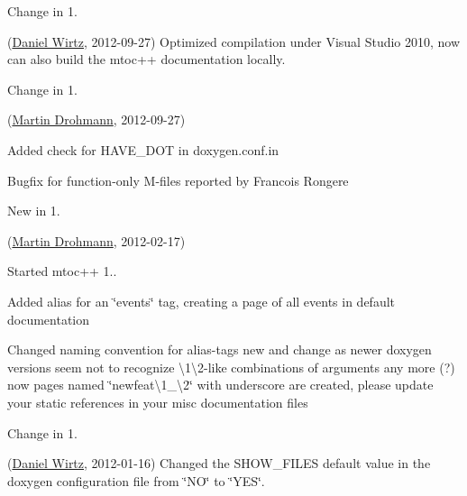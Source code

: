 \begin{DoxyRefDesc}{Change in 1.}
\item[\hyperlink{changelog1_4__changelog1_4000007}{Change in 1.\+4}](\hyperlink{developers_dw}{Daniel Wirtz}, 2012-\/09-\/27) Optimized compilation under Visual Studio 2010, now can also build the mtoc++ documentation locally.\end{DoxyRefDesc}


\begin{DoxyRefDesc}{Change in 1.}
\item[\hyperlink{changelog1_4__changelog1_4000008}{Change in 1.\+4}](\hyperlink{developers_md}{Martin Drohmann}, 2012-\/09-\/27)
\begin{DoxyItemize}
\item Added check for H\+A\+V\+E\+\_\+\+D\+O\+T in doxygen.\+conf.\+in
\item Bugfix for function-\/only M-\/files reported by Francois Rongere
\end{DoxyItemize}\end{DoxyRefDesc}


\begin{DoxyRefDesc}{New in 1.}
\item[\hyperlink{newfeat1_4__newfeat1_4000002}{New in 1.\+4}](\hyperlink{developers_md}{Martin Drohmann}, 2012-\/02-\/17)
\begin{DoxyItemize}
\item Started mtoc++ 1..
\item Added alias for an \char`\"{}events\char`\"{} tag, creating a page of all events in default documentation
\item Changed naming convention for alias-\/tags new and change as newer doxygen versions seem not to recognize \textbackslash{}1\textbackslash{}2-\/like combinations of arguments any more (?) now pages named \char`\"{}newfeat\textbackslash{}1\+\_\+\textbackslash{}2\char`\"{} with underscore are created, please update your static references in your misc documentation files
\end{DoxyItemize}\end{DoxyRefDesc}


\begin{DoxyRefDesc}{Change in 1.}
\item[\hyperlink{changelog1_3__changelog1_3000021}{Change in 1.\+3}](\hyperlink{developers_dw}{Daniel Wirtz}, 2012-\/01-\/16) Changed the {\ttfamily S\+H\+O\+W\+\_\+\+F\+I\+L\+E\+S} default value in the doxygen configuration file from \char`\"{}\+N\+O\char`\"{} to \char`\"{}\+Y\+E\+S\char`\"{}.\end{DoxyRefDesc}



